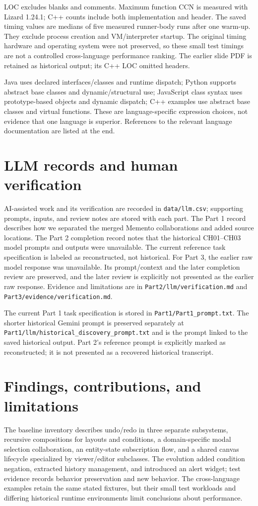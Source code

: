 \documentclass[11pt,a4paper]{article}
\newcommand{\code}[1]{\texttt{\small #1}}
\begin{document}
LOC excludes blanks and comments. Maximum function CCN is measured with Lizard
1.24.1; C++ counts include both implementation and header. The saved timing
values are medians of five measured runner-body runs after one warm-up. They
exclude process creation and VM/interpreter startup. The original timing
hardware and operating system were not preserved, so these small test timings
are not a controlled cross-language performance ranking. The earlier slide
PDF is retained as historical output; its C++ LOC omitted headers.

Java uses declared interfaces/classes and runtime dispatch; Python supports
abstract base classes and dynamic/structural use; JavaScript class syntax uses
prototype-based objects and dynamic dispatch; C++ examples use abstract base
classes and virtual functions. These are language-specific expression choices,
not evidence that one language is superior. References to the relevant
language documentation are listed at the end.

\section{LLM records and human verification}
AI-assisted work and its verification are recorded in \code{data/llm.csv};
supporting prompts, inputs, and review notes are stored with each part. The
Part 1 record describes how we separated the merged Memento collaborations
and added source locations. The Part 2 completion record notes that the
historical CH01--CH03 model prompts and outputs were unavailable. The current
reference task specification is labeled as reconstructed, not historical. For Part 3, the
earlier raw model response was unavailable. Its prompt/context and the later
completion review are preserved, and the later review is explicitly not
presented as the earlier raw response. Evidence and limitations are in
\code{Part2/llm/verification.md} and \code{Part3/evidence/verification.md}.

The current Part 1 task specification is stored in
\code{Part1/Part1\_prompt.txt}. The shorter historical Gemini prompt is
preserved separately at \code{Part1/llm/historical\_discovery\_prompt.txt}
and is the prompt linked to the saved historical output. Part 2's reference
prompt is explicitly marked as reconstructed; it is not presented as a recovered
historical transcript.

\section{Findings, contributions, and limitations}
The baseline inventory describes undo/redo in three separate subsystems,
recursive compositions for layouts and conditions, a domain-specific modal
selection collaboration, an entity-state subscription flow, and a shared
canvas lifecycle specialized by viewer/editor subclasses. The evolution added
condition negation, extracted history management, and introduced an alert
widget; test evidence records behavior preservation and new behavior. The
cross-language examples retain the same stated fixtures, but their small test
workloads and differing historical runtime environments limit conclusions
about performance.
\end{document}
